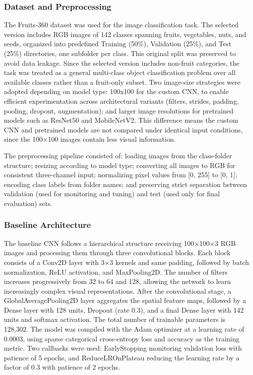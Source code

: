 \documentclass[conference]{IEEEtran}
\begin{document}
\subsubsection{Dataset and Preprocessing}
The Fruits-360 dataset was used for the image classification task. The selected version includes RGB images of 142 classes spanning fruits, vegetables, nuts, and seeds, organized into predefined Training (50\%), Validation (25\%), and Test (25\%) directories, one subfolder per class. This original split was preserved to avoid data leakage. Since the selected version includes non-fruit categories, the task was treated as a general multi-class object classification problem over all available classes rather than a fruit-only subset.
Two image-size strategies were adopted depending on model type: 100x100 for the custom CNN, to enable efficient experimentation across architectural variants (filters, strides, padding, pooling, dropout, augmentation); and  larger image resolutions for pretrained models such as ResNet50 and MobileNetV2. This difference means the custom CNN and pretrained models are not compared under identical input conditions, since the 100×100 images contain less visual information. 

The preprocessing pipeline consisted of: loading images from the class-folder structure; resizing according to model type; converting all images to RGB for consistent three-channel input; normalizing pixel values from [0, 255] to [0, 1]; encoding class labels from folder names; and preserving strict separation between validation (used for monitoring and tuning) and test (used only for final evaluation) sets.
\\

\subsubsection{Baseline Architecture}
The baseline CNN follows a hierarchical structure receiving 100×100×3 RGB images and processing them through three convolutional blocks. Each block consists of a Conv2D layer with 3×3 kernels and same padding, followed by batch normalization, ReLU activation, and MaxPooling2D. The number of filters increases progressively from 32 to 64 and 128, allowing the network to learn increasingly complex visual representations. After the convolutional stage, a GlobalAveragePooling2D layer aggregates the spatial feature maps, followed by a Dense layer with 128 units, Dropout (rate 0.3), and a final Dense layer with 142 units and softmax activation. The total number of trainable parameters is 128,302.
The model was compiled with the Adam optimizer at a learning rate of 0.0003, using sparse categorical cross-entropy loss and accuracy as the training metric. Two callbacks were used: EarlyStopping monitoring validation loss with patience of 5 epochs, and ReduceLROnPlateau reducing the learning rate by a factor of 0.3 with patience of 2 epochs. 
\end{document}

